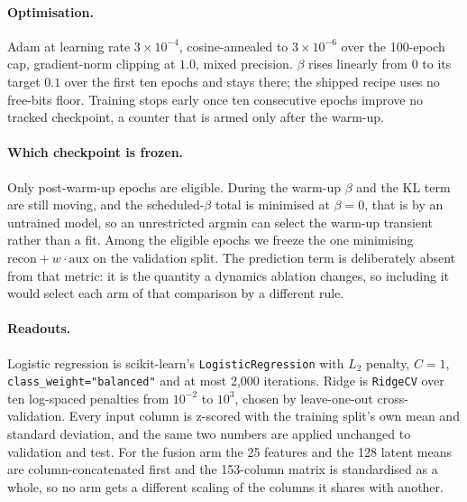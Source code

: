 \documentclass{article}
\begin{document}
\paragraph{Optimisation.} Adam at learning rate $3\times10^{-4}$, cosine-annealed to
$3\times10^{-6}$ over the 100-epoch cap, gradient-norm clipping at $1.0$, mixed precision. $\beta$
rises linearly from $0$ to its target $0.1$ over the first ten epochs and stays there; the shipped
recipe uses no free-bits floor. Training stops early once ten consecutive epochs improve no tracked
checkpoint, a counter that is armed only after the warm-up.

\paragraph{Which checkpoint is frozen.} Only post-warm-up epochs are eligible. During the warm-up
$\beta$ and the KL term are still moving, and the scheduled-$\beta$ total is minimised at $\beta=0$,
that is by an untrained model, so an unrestricted argmin can select the warm-up transient rather than
a fit. Among the eligible epochs we freeze the one minimising
$\mathrm{recon} + w\cdot\mathrm{aux}$ on the validation split. The prediction term is deliberately
absent from that metric: it is the quantity a dynamics ablation changes, so including it would select
each arm of that comparison by a different rule.

\paragraph{Readouts.} Logistic regression is scikit-learn's \texttt{LogisticRegression} with $L_{2}$
penalty, $C=1$, \texttt{class\_weight="balanced"} and at most 2{,}000 iterations. Ridge is
\texttt{RidgeCV} over ten log-spaced penalties from $10^{-2}$ to $10^{3}$, chosen by leave-one-out
cross-validation. Every input column is z-scored with the training split's own mean and standard
deviation, and the same two numbers are applied unchanged to validation and test. For the fusion arm
the 25 features and the 128 latent means are column-concatenated first and the 153-column matrix is
standardised as a whole, so no arm gets a different scaling of the columns it shares with another.
\end{document}
